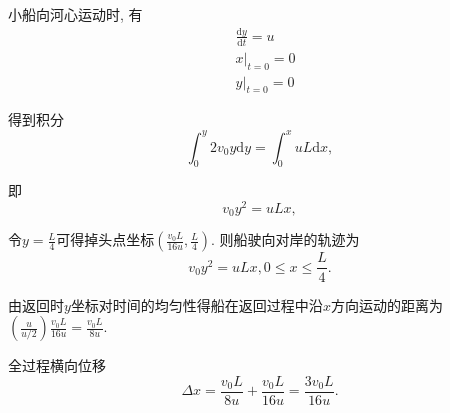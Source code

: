 \documentclass[twocolumn]{ctexart}
\begin{document}
小船向河心运动时, 有
\begin{align} 
&\frac{\mathrm{d}y}{\mathrm{d}t}=u\\ 
&\left.x\right|_{t=0}=0\\ 
&\left.y\right|_{t=0}=0 
\end{align} 

得到积分 
$$\int_{0}^{y}2v_0y\mathrm{d}y=\int_{0}^{x}uL\mathrm{d}x,$$ 

即 
$$v_0y^2=uLx,$$ 

令$\displaystyle{y=\frac{L}{4}}$可得掉头点坐标$\displaystyle{\left(\frac{v_0L}{16u}, \frac{L}{4}\right)}$. 则船驶向对岸的轨迹为 
$$v_0y^2=uLx,0\leq x\leq \frac{L}{4}.$$ 

由返回时$y$坐标对时间的均匀性得船在返回过程中沿$x$方向运动的距离为$\displaystyle{\left(\frac{u}{u/2}\right)\frac{v_0L}{16u}=\frac{v_0L}{8u}}$.

全过程横向位移
$$\Delta x=\frac{v_0L}{8u}+\frac{v_0L}{16u}=\frac{3v_0L}{16u}.$$
\end{document}
